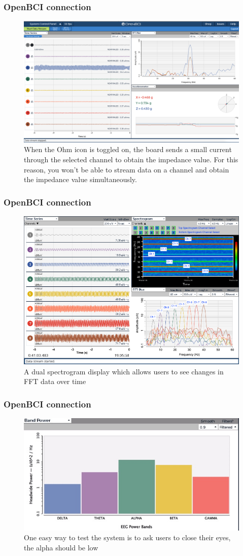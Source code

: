 \documentclass{beamer}
\begin{document}
\begin{frame}
\frametitle{OpenBCI connection}
\begin{figure}
	\includegraphics[width=0.8\linewidth]{image/GUI_Impedance}
	\caption{When the Ohm icon is toggled on, the board sends a small current through the selected channel to obtain the impedance value. For this reason, you won't be able to stream data on a channel and obtain the impedance value simultaneously.}
\end{figure}
\end{frame}

\begin{frame}
\frametitle{OpenBCI connection}
\begin{figure}
	\includegraphics[width=0.7\linewidth]{image/spectrogram}
	\caption{A dual spectrogram display which allows users to see changes in FFT data over time}
\end{figure}
\end{frame}

\begin{frame}
\frametitle{OpenBCI connection}
\begin{figure}
	\includegraphics[width=0.7\linewidth]{image/bandpower}
	\caption{One easy way to test the system is to ask users to close their eyes, the alpha should be low}
\end{figure}
\end{frame}
\end{document}
